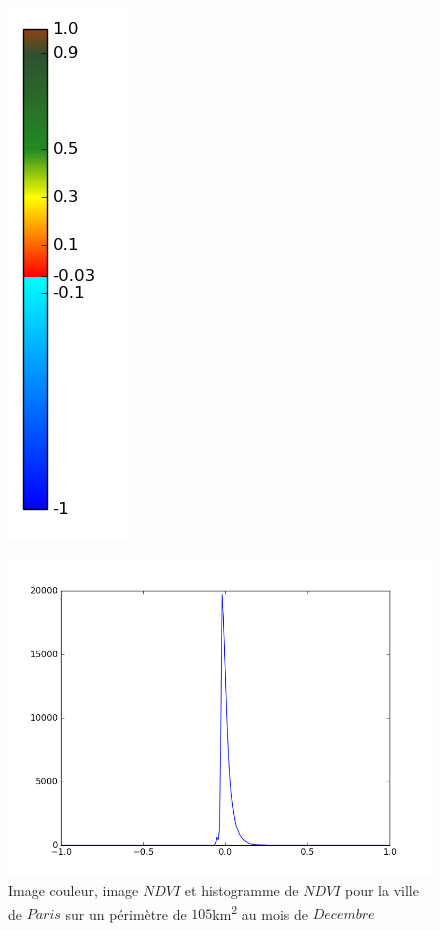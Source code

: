 \documentclass{book}
\begin{document}
\begin{figure}[H]
{\includegraphics[scale=0.4]{images/colormap.png}
}
\begin{center}
\includegraphics[scale=0.4]{images/Paris/12_ndvi_histo.png}
\end{center}
\caption{Image couleur, image $NDVI$ et histogramme de $NDVI$ pour la ville de $Paris$ sur un périmètre de $105$km\textsuperscript{2} au mois de $Decembre$}
\label{paris_ndvi}
\end{figure}
\end{document}
